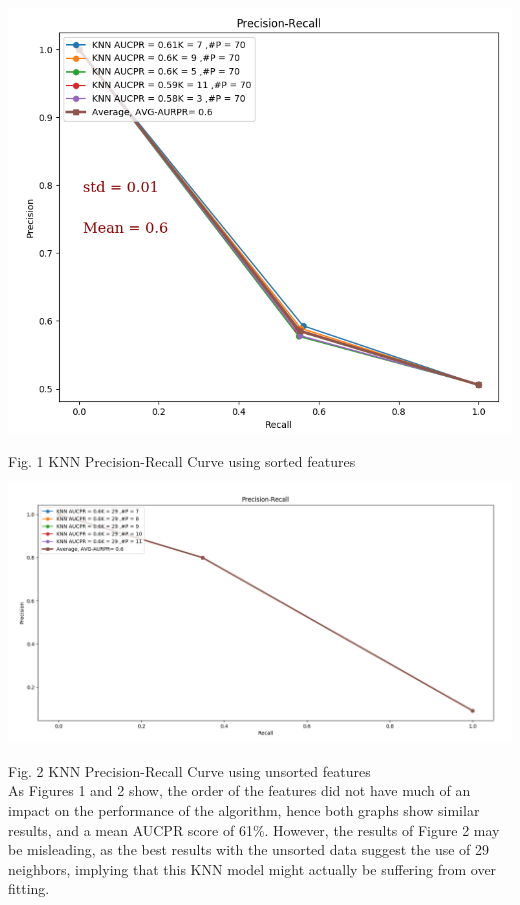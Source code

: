 \documentclass{article}
\begin{document}
\begin{center}
\includegraphics[scale=.25]{KNN_New.png} %
\end{center}
Fig. 1 KNN Precision-Recall Curve using sorted features\\

\begin{center}
\includegraphics[scale=.17]{KNN_Withoutfeature.png} %
\end{center}
Fig. 2 KNN Precision-Recall Curve using unsorted features\\

As Figures 1 and 2 show, the order of the features did not have much of an impact on the performance of the algorithm, hence both graphs show similar results, and a mean AUCPR score of 61\%. However, the results of Figure 2 may be misleading, as the best results with the unsorted data suggest the use of 29 neighbors, implying that this KNN model might actually be suffering from over fitting. 
\end{document}
